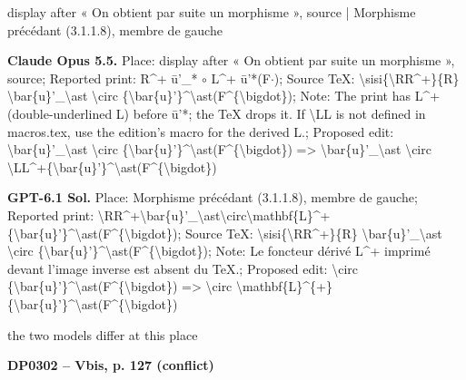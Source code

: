 display after « On obtient par suite un morphisme », source | Morphisme précédant (3.1.1.8), membre de gauche\par
\textbf{Claude Opus 5.5.} Place: display after « On obtient par suite un morphisme », source; Reported print: R\textasciicircum{}+ ū'\_* \ensuremath{\circ} L\textasciicircum{}+ ū'*(F\ensuremath{\cdot}); Source TeX: \textbackslash{}sisi\{\textbackslash{}RR\textasciicircum{}+\}\{R\} \textbackslash{}bar\{u\}'\_\textbackslash{}ast \textbackslash{}circ \{\textbackslash{}bar\{u\}'\}\textasciicircum{}\textbackslash{}ast(F\textasciicircum{}\{\textbackslash{}bigdot\}); Note: The print has L\textasciicircum{}+ (double-underlined L) before ū'*; the TeX drops it. If \textbackslash{}LL is not defined in macros.tex, use the edition's macro for the derived L.; Proposed edit: \textbackslash{}bar\{u\}'\_\textbackslash{}ast \textbackslash{}circ \{\textbackslash{}bar\{u\}'\}\textasciicircum{}\textbackslash{}ast(F\textasciicircum{}\{\textbackslash{}bigdot\}) =\allowbreak > \textbackslash{}bar\{u\}'\_\textbackslash{}ast \textbackslash{}circ \textbackslash{}LL\textasciicircum{}+\{\textbackslash{}bar\{u\}'\}\textasciicircum{}\textbackslash{}ast(F\textasciicircum{}\{\textbackslash{}bigdot\})\par
\textbf{GPT-6.1 Sol.} Place: Morphisme précédant (3.1.1.8), membre de gauche; Reported print: \textbackslash{}RR\textasciicircum{}+\textbackslash{}bar\{u\}'\_\textbackslash{}ast\textbackslash{}circ\textbackslash{}mathbf\{L\}\textasciicircum{}+\{\textbackslash{}bar\{u\}'\}\textasciicircum{}\textbackslash{}ast(F\textasciicircum{}\{\textbackslash{}bigdot\}); Source TeX: \textbackslash{}sisi\{\textbackslash{}RR\textasciicircum{}+\}\{R\} \textbackslash{}bar\{u\}'\_\textbackslash{}ast \textbackslash{}circ \{\textbackslash{}bar\{u\}'\}\textasciicircum{}\textbackslash{}ast(F\textasciicircum{}\{\textbackslash{}bigdot\}); Note: Le foncteur dérivé L\textasciicircum{}+ imprimé devant l'image inverse est absent du TeX.; Proposed edit: \textbackslash{}circ \{\textbackslash{}bar\{u\}'\}\textasciicircum{}\textbackslash{}ast(F\textasciicircum{}\{\textbackslash{}bigdot\}) =\allowbreak > \textbackslash{}circ \textbackslash{}mathbf\{L\}\textasciicircum{}\{+\} \{\textbackslash{}bar\{u\}'\}\textasciicircum{}\textbackslash{}ast(F\textasciicircum{}\{\textbackslash{}bigdot\})\par
the two models differ at this place\par
\par\noindent\hypertarget{DP0302}{}\textbf{DP0302 -- Vbis, p. 127 (conflict)}\par
